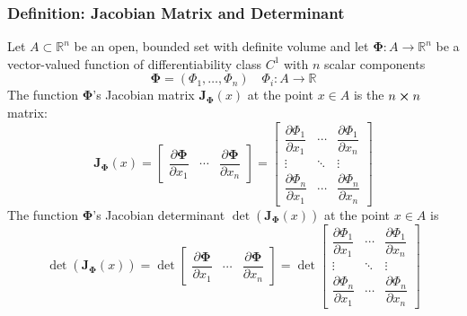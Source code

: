 \documentclass[11pt, a4paper]{article}
\begin{document}
\subsubsection{Definition: Jacobian Matrix and Determinant}
Let $ A \subset \mathbb{R}^n $ be an open, bounded set with definite volume and let $ \bm{\Phi}: A \rightarrow \mathbb{R}^n $ be a vector-valued function of differentiability class $ C^{1} $ with $ n $ scalar components
\begin{equation*}
	\bm{\Phi} = \left(\Phi_1, \dots, \Phi_n \right) \quad \Phi_i : A \rightarrow \mathbb{R}
\end{equation*}
The function $\bm{\Phi}$'s Jacobian matrix $  \mathbf{J_{\bm{\Phi}}}(x) $ at the point $ x \in A $ is the $ n \cross n $ matrix:
\[
\mathbf{J_{\bm{\Phi}}}(x) =
	\begin{bmatrix}
		\dfrac{\partial \mathbf{\Phi}}{\partial x_1} & \cdots & \dfrac{\partial \mathbf{\Phi}}{\partial x_n} \end{bmatrix}
= \begin{bmatrix}
\dfrac{\partial \Phi_1}{\partial x_1} & \cdots & \dfrac{\partial \Phi_1}{\partial x_n}\\
\vdots & \ddots & \vdots\\
\dfrac{\partial \Phi_n}{\partial x_1} & \cdots & \dfrac{\partial \Phi_n}{\partial x_n} \end{bmatrix}
\]
The function $\bm{\Phi}$'s Jacobian determinant $  \det \left(\mathbf{J_{\Phi}}(x)\right) $ at the point $ x \in A $ is
\[
\det (\mathbf{J_{\Phi}}(x))=
\det \begin{bmatrix}
\dfrac{\partial \mathbf{\Phi}}{\partial x_1} & \cdots & \dfrac{\partial \mathbf{\Phi}}{\partial x_n} \end{bmatrix}
= \det \begin{bmatrix}
\dfrac{\partial \Phi_1}{\partial x_1} & \cdots & \dfrac{\partial \Phi_1}{\partial x_n}\\
\vdots & \ddots & \vdots\\
\dfrac{\partial \Phi_n}{\partial x_1} & \cdots & \dfrac{\partial \Phi_n}{\partial x_n} \end{bmatrix}
\]
\end{document}
